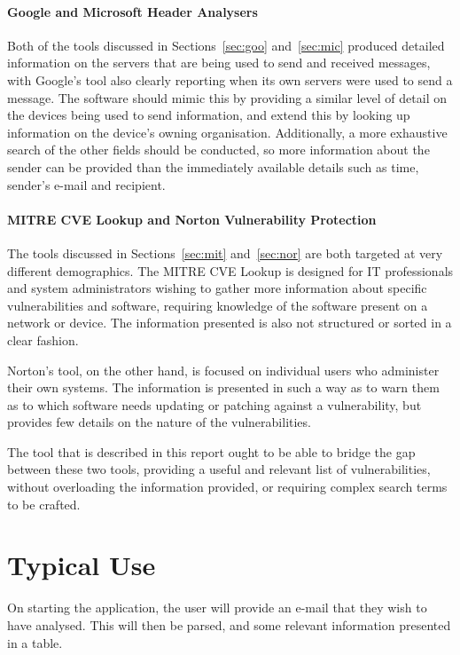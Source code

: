 \paragraph{Google and Microsoft Header Analysers} Both of the tools discussed
in Sections~\ref{sec:goo} and~\ref{sec:mic} produced detailed information on
the servers that are being used to send and received messages, with Google's
tool also clearly reporting when its own servers were used to send a message.
The software should mimic this by providing a similar level of detail on the
devices being used to send information, and extend this by looking up
information on the device's owning organisation.  Additionally, a more
exhaustive search of the other fields should be conducted, so more information
about the sender can be provided than the immediately available details such as
time, sender's e-mail and recipient.

\paragraph{MITRE CVE Lookup and Norton Vulnerability Protection} The tools
discussed in Sections~\ref{sec:mit} and~\ref{sec:nor} are both targeted at very
different demographics.  The MITRE CVE Lookup is designed for IT professionals
and system administrators wishing to gather more information about specific
vulnerabilities and software, requiring knowledge of the software present on a
network or device.  The information presented is also not structured or sorted
in a clear fashion.

Norton's tool, on the other hand, is focused on individual users who administer
their own systems.  The information is presented in such a way as to warn them
as to which software needs updating or patching against a vulnerability, but
provides few details on the nature of the vulnerabilities.

The tool that is described in this report ought to be able to bridge the gap
between these two tools, providing a useful and relevant list of
vulnerabilities, without overloading the information provided, or requiring
complex search terms to be crafted. 

\section{Typical Use}

On starting the application, the user will provide an e-mail that they wish
to have analysed.  This will then be parsed, and some relevant information
presented in a table.

